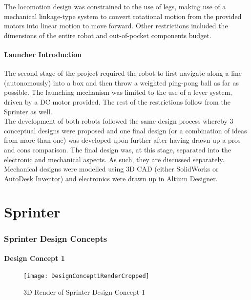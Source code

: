     The locomotion design was constrained to the use of legs, making use of a mechanical linkage-type system to convert rotational motion from the provided motors into linear motion to move forward.  Other restrictions included the dimensions of the entire robot and out-of-pocket components budget.

  \subsection{Launcher Introduction}
  \label{sub:Launcher Introduction}
    The second stage of the project required the robot to first navigate along a line (autonomously) into a box and then throw a weighted ping-pong ball as far as possible. The launching mechanism was limited to the use of a lever system, driven by a DC motor provided.  The rest of the restrictions follow from the Sprinter as well. \\

  The development of both robots followed the same design process whereby 3 conceptual designs were proposed and one final design (or a combination of ideas from more than one) was developed upon further after having drawn up a pros and cons comparison.  The final design was, at this stage, separated into the electronic and mechanical aspects.  As such, they are discussed separately.  Mechanical designs were modelled using 3D CAD (either SolidWorks or AutoDesk Inventor) and electronics were drawn up in Altium Designer.


\clearpage
\part{Sprinter}
\label{part:sprinter}

\section{Sprinter Design Concepts}
\label{sec:Sprinter Design Concepts}
  \subsection{Design Concept 1}
  \label{sub:Design Concept 1}
    \begin{figure}[H]
    \label{fig:3dConcept1}
      \begin{center}
        \texttt{[image: DesignConcept1RenderCropped]}
        \caption{3D Render of Sprinter Design Concept 1}
      \end{center}
    \end{figure}

